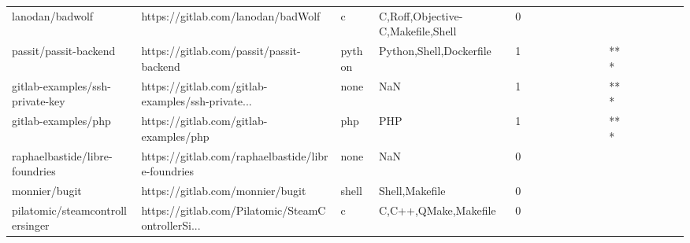 \begin{tabular}{llllrlllllllllllll}
lanodan/badwolf                                    &                 https://gitlab.com/lanodan/badWolf &                 c &                  C,Roff,Objective-C,Makefile,Shell &       0 &         &        &           &                &                 &        &           &           &          &          &       &              &          \\
passit/passit-backend                              &           https://gitlab.com/passit/passit-backend &            python &                            Python,Shell,Dockerfile &       1 &         &        &           &                &                 &        &           &       *** &          &          &       &              &          \\
gitlab-examples/ssh-private-key                    &  https://gitlab.com/gitlab-examples/ssh-private... &              none &                                                NaN &       1 &         &        &           &                &                 &        &           &       *** &          &          &       &              &          \\
gitlab-examples/php                                &             https://gitlab.com/gitlab-examples/php &               php &                                                PHP &       1 &         &        &           &                &                 &        &           &       *** &          &          &       &              &          \\
raphaelbastide/libre-foundries                     &  https://gitlab.com/raphaelbastide/libre-foundries &              none &                                                NaN &       0 &         &        &           &                &                 &        &           &           &          &          &       &              &          \\
monnier/bugit                                      &                   https://gitlab.com/monnier/bugit &             shell &                                     Shell,Makefile &       0 &         &        &           &                &                 &        &           &           &          &          &       &              &          \\
pilatomic/steamcontrollersinger                    &  https://gitlab.com/Pilatomic/SteamControllerSi... &                 c &                               C,C++,QMake,Makefile &       0 &         &        &           &                &                 &        &           &           &          &          &       &              &          \\

\end{tabular}
